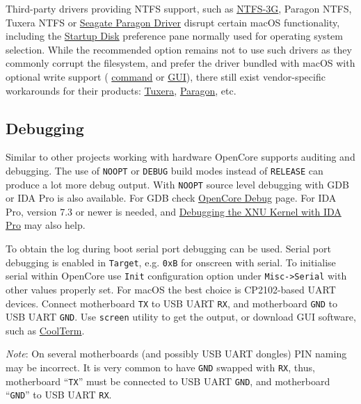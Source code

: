 \documentclass[]{article}
\begin{document}
  Third-party drivers providing NTFS support, such as
  \href{https://www.tuxera.com/community/open-source-ntfs-3g}{NTFS-3G}, Paragon NTFS,
  Tuxera NTFS or \href{https://www.seagate.com/support/software/paragon}{Seagate Paragon Driver}
  disrupt certain macOS functionality, including the
  \href{https://support.apple.com/HT202796}{Startup Disk} preference
  pane normally used for operating system selection. While the recommended option
  remains not to use such drivers as they commonly corrupt the filesystem, and prefer
  the driver bundled with macOS with optional write support (
  \href{http://osxdaily.com/2013/10/02/enable-ntfs-write-support-mac-os-x}{command} or
  \href{https://mounty.app}{GUI}),
  there still exist vendor-specific workarounds for their products:
  \href{https://www.tuxera.com/products/tuxera-ntfs-for-mac/faq}{Tuxera},
  \href{https://kb.paragon-software.com/article/6604}{Paragon}, etc.

\subsection{Debugging}\label{troubleshootingdebug}

Similar to other projects working with hardware OpenCore supports auditing and debugging.
The use of \texttt{NOOPT} or \texttt{DEBUG} build modes instead of \texttt{RELEASE}
can produce a lot more debug output. With \texttt{NOOPT} source level debugging with
GDB or IDA Pro is also available. For GDB check
\href{https://github.com/acidanthera/OpenCorePkg/tree/master/Debug}{OpenCore Debug}
page. For IDA Pro, version 7.3 or newer is needed, and
\href{https://www.hex-rays.com/products/ida/support/tutorials/index.shtml}{Debugging the XNU Kernel with IDA Pro}
may also help.

To obtain the log during boot serial port debugging can be used. Serial port
debugging is enabled in \texttt{Target}, e.g. \texttt{0xB} for onscreen with serial. To
initialise serial within OpenCore use \texttt{Init} configuration option under \texttt{Misc->Serial} with other values properly set.
For macOS the best choice is CP2102-based UART devices. Connect motherboard \texttt{TX}
to USB UART \texttt{RX}, and motherboard \texttt{GND} to USB UART \texttt{GND}. Use
\texttt{screen} utility to get the output, or download GUI software, such as
\href{https://freeware.the-meiers.org}{CoolTerm}.

\emph{Note}: On several motherboards (and possibly USB UART dongles) PIN naming may be
incorrect. It is very common to have \texttt{GND} swapped with \texttt{RX}, thus,
motherboard ``\texttt{TX}'' must be connected to USB UART \texttt{GND}, and motherboard ``\texttt{GND}''
to USB UART \texttt{RX}.
\end{document}
